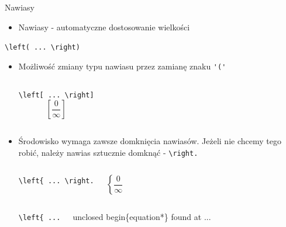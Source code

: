 \documentclass{beamer}
\theoremstyle{newblock}
\begin{document}
\begin{frame}[fragile]{Nawiasy}
        \begin{itemize}
        \item Nawiasy - automatyczne dostosowanie wielkości
    \end{itemize}
        \centering
        \verb|\left( ... \right)|

    \begin{itemize}
    \item Możliwość zmiany typu nawiasu przez zamianę znaku \verb|'('| 
    

    \begin{columns}
            \centering
            \verb|\left[ ... \right]|
            \begin{equation*}
                \left[ \frac{0}{\infty}\right]
            \end{equation*}
    \end{columns}
    
    \item Środowisko wymaga zawsze domknięcia nawiasów. Jeżeli nie chcemy tego robić, należy nawias sztucznie domknąć  - \verb|\right.|

    
    \begin{columns}
            \centering

            \verb|\left{ ... \right.|
            
            \begin{equation*}
                \left\{ \frac{0}{\infty}\right.
            \end{equation*}
            
    \end{columns}
    \begin{columns}
            \centering

            \verb|\left{ ...|
            
            
            \alert{unclosed begin\{equation*\} found at ...}
    \end{columns}
    \end{itemize}
\end{frame}
\end{document}
